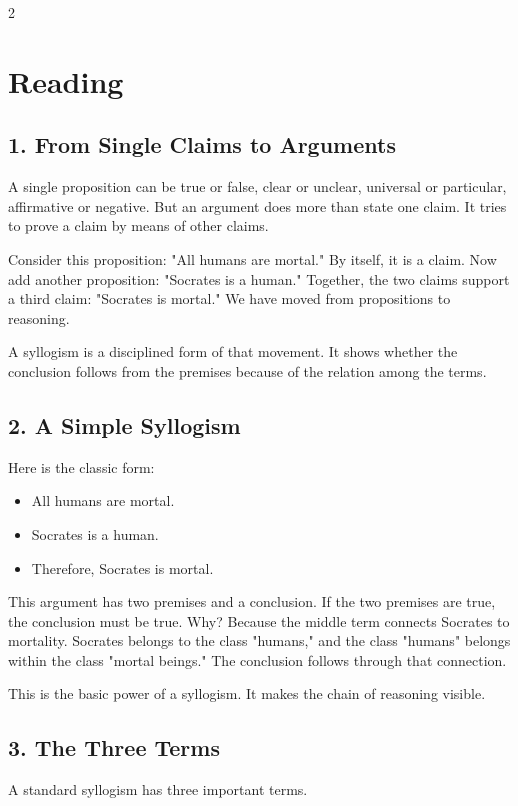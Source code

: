 \documentclass[12pt]{article}
\begin{document}
\begin{multicols}{2}
\section*{Reading}

\subsection*{1. From Single Claims to Arguments}
A single proposition can be true or false, clear or unclear, universal or particular, affirmative or negative. But an argument does more than state one claim. It tries to prove a claim by means of other claims.

Consider this proposition: "All humans are mortal." By itself, it is a claim. Now add another proposition: "Socrates is a human." Together, the two claims support a third claim: "Socrates is mortal." We have moved from propositions to reasoning.

A syllogism is a disciplined form of that movement. It shows whether the conclusion follows from the premises because of the relation among the terms.

\subsection*{2. A Simple Syllogism}
Here is the classic form:

\begin{itemize}[leftmargin=*]
\item All humans are mortal.
\item Socrates is a human.
\item Therefore, Socrates is mortal.
\end{itemize}

This argument has two premises and a conclusion. If the two premises are true, the conclusion must be true. Why? Because the middle term connects Socrates to mortality. Socrates belongs to the class "humans," and the class "humans" belongs within the class "mortal beings." The conclusion follows through that connection.

This is the basic power of a syllogism. It makes the chain of reasoning visible.

\subsection*{3. The Three Terms}
A standard syllogism has three important terms.


\end{multicols}
\end{document}
